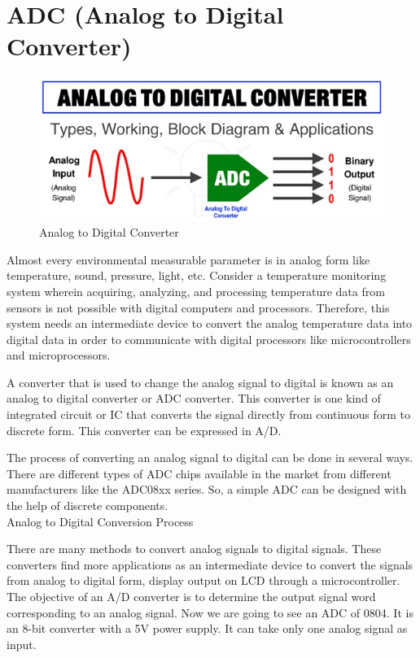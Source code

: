 \documentclass[11pt,a4paper,twoside]{article}
\begin{document}
\section{ADC (Analog to Digital Converter)} 
\begin{figure}[H]
\includegraphics[width=1\textwidth]{Fig 20.jpg}
\caption{Analog to Digital Converter}
\end{figure}
Almost every environmental measurable parameter is in analog form like temperature, sound, pressure, light, etc. Consider a temperature monitoring system wherein acquiring, analyzing, and processing temperature data from sensors is not possible with digital computers and processors. Therefore, this system needs an intermediate device to convert the analog temperature data into digital data in order to communicate with digital processors like microcontrollers and microprocessors.\par 
A converter that is used to change the analog signal to digital is known as an analog to digital converter or ADC converter. This converter is one kind of integrated circuit or IC that converts the signal directly from continuous form to discrete form. This converter can be expressed in A/D.\par
The process of converting an analog signal to digital can be done in several ways. There are different types of ADC chips available in the market from different manufacturers like the ADC08xx series. So, a simple ADC can be designed with the help of discrete components.\\
Analog to Digital Conversion Process\par
There are many methods to convert analog signals to digital signals. These converters find more applications as an intermediate device to convert the signals from analog to digital form, display output on LCD through a microcontroller. The objective of an A/D converter is to determine the output signal word corresponding to an analog signal. Now we are going to see an ADC of 0804. It is an 8-bit converter with a 5V power supply. It can take only one analog signal as input.
\end{document}
